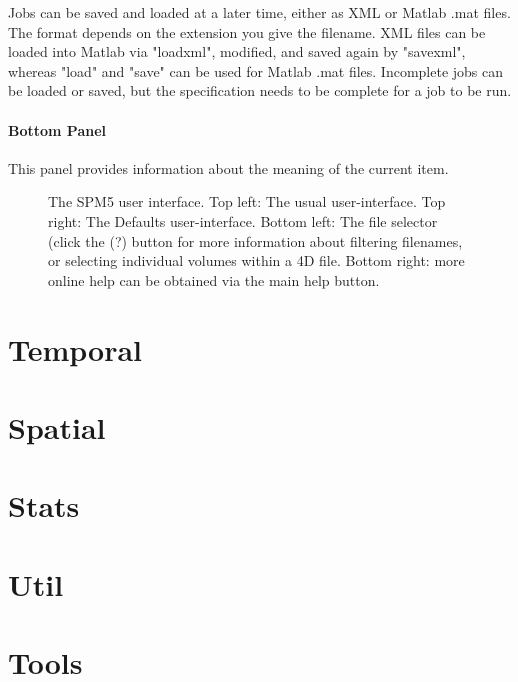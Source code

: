 \documentclass[a4paper,titlepage]{book}
\begin{document}
Jobs can be saved and loaded at a later time, either as XML or Matlab .mat files.  The format depends on the extension you give the filename. XML files can be loaded into Matlab via "loadxml", modified, and saved again by "savexml", whereas "load" and "save" can be used for Matlab .mat files. Incomplete jobs can be loaded or saved, but the specification needs to be complete for a job to be run.




\subsection*{Bottom Panel}

This panel provides information about the meaning of the current item.

\begin{figure} \begin{center}    \end{center} \caption{The SPM5 user interface. Top left: The usual user-interface.  Top right: The Defaults user-interface. Bottom left: The file selector (click the (?) button for more information about filtering filenames, or selecting individual volumes within a 4D file. Bottom right: more online help can be obtained via the main help button.} \end{figure} 

\part{Temporal}


\part{Spatial}






\part{Stats}



\part{Util}











\part{Tools}


\parskip=0mm

\end{document}
